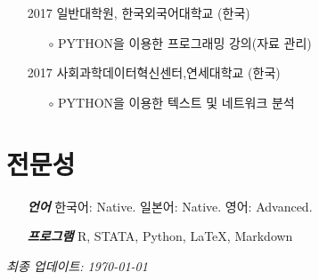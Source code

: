 \documentclass[11pt]{res} %
\begin{document}
\begin{resume}
\begin{itemize}[wide = 0pt]
\begin{itemize}
	\end{itemize}
	\item[2017] 일반대학원, 한국외국어대학교 (한국)
	\begin{itemize} \itemsep -2pt 
		\item[$\circ$] PYTHON을 이용한 프로그래밍 강의(자료 관리)
	\end{itemize}		
	\item[2017] 사회과학데이터혁신센터,연세대학교 (한국)
	\begin{itemize}
		\item[$\circ$]  PYTHON을 이용한 텍스트 및 네트워크 분석
	\end{itemize}
\end{itemize}

\section{전문성}
\begin{itemize}[wide=0pt]
	\item[\textit{\bf 언어}] 한국어: Native. 일본어: Native. 영어: Advanced.
	\item[\textit{\bf 프로그램}] R, STATA, Python, \LaTeX, Markdown
\end{itemize}
\mbox{}
\vfill
\centering \textit{최종 업데이트: \today}

\end{resume}
\end{document}
